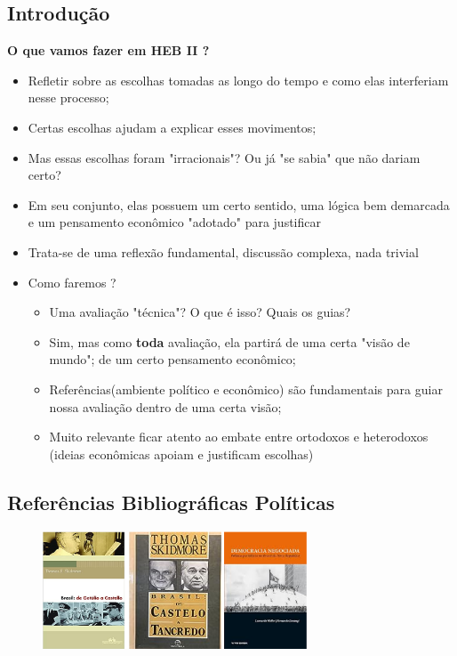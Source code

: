 \documentclass[a4paper,12pt]{article}[abntex2]
\begin{document}
\subsection{\textbf{Introdução}}
\textbf{O que vamos fazer em HEB II ?}\begin{itemize}
    \item Refletir sobre as escolhas tomadas as longo do tempo e como elas interferiam nesse processo;
    \item Certas escolhas ajudam a explicar esses movimentos;
    \item Mas essas escolhas foram "irracionais"? Ou já "se sabia" que não dariam certo?
    \item Em seu conjunto, elas possuem um certo sentido, uma lógica bem demarcada e um pensamento econômico "adotado" para justificar
    \item Trata-se de uma reflexão fundamental, discussão complexa, nada trivial
    \item Como faremos ? \begin{itemize}
        \item Uma avaliação "técnica"? O que é isso? Quais os guias?
        \item Sim, mas como \textbf{toda} avaliação, ela partirá de uma certa "visão de mundo"; de um certo pensamento econômico;
        \item Referências(ambiente político e econômico) são fundamentais para guiar nossa avaliação dentro de uma certa visão;
        \item Muito relevante ficar atento ao embate entre ortodoxos e heterodoxos (ideias econômicas apoiam e justificam escolhas)
    \end{itemize}
\end{itemize}

\subsection{\textbf{Referências Bibliográficas Políticas}}

\begin{figure}[H]
        \centering
        \includegraphics[width=0.7\textwidth]{Imagens/a1i2.png}
\end{figure}
\end{document}
